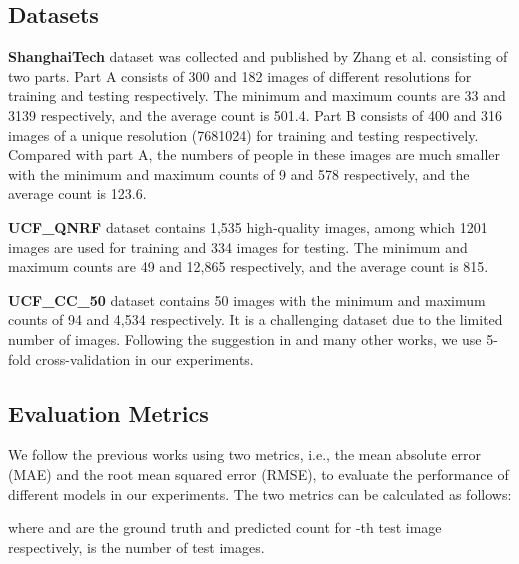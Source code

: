 \documentclass[journal,comsoc]{IEEEtran}
\begin{document}
\subsection{Datasets}\label{sec:dataset}
\quad \textbf{ShanghaiTech} dataset was collected and published by Zhang et al. \cite{zhang2016single} consisting of two parts. Part A consists of 300 and 182 images of different resolutions for training and testing respectively. The minimum and maximum counts are 33 and 3139 respectively, and the average count is 501.4. Part B consists of 400 and 316 images of a unique resolution (7681024) for training and testing respectively. Compared with part A, the numbers of people in these images are much smaller with the minimum and maximum counts of 9 and 578 respectively, and the average count is 123.6.

\textbf{UCF\_QNRF} dataset \cite{idrees2018composition} contains 1,535 high-quality images, among which 1201 images are used for training and 334 images for testing. The minimum and maximum counts are 49 and 12,865 respectively, and the average count is 815.

\textbf{UCF\_CC\_50} dataset \cite{idrees2013multi} contains 50 images with the minimum and maximum counts of 94 and 4,534 respectively. It is a challenging dataset due to the limited number of images. Following the suggestion in \cite{idrees2013multi} and many other works, we use 5-fold cross-validation in our experiments. 

\subsection{Evaluation Metrics} \label{sec:evaluation}
We follow the previous works using two metrics, i.e., the mean absolute error (MAE) and the root mean squared error (RMSE), to evaluate the performance of different models in our experiments. The two metrics can be calculated as follows:


where  and  are the ground truth and predicted count for -th test image respectively,  is the number of test images.
\end{document}
